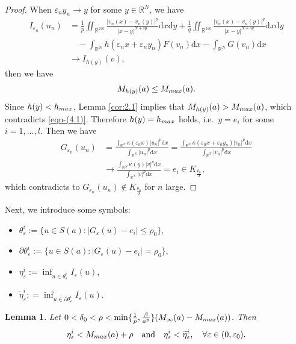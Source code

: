 \documentclass[10pt,a4paper]{amsart}
\numberwithin{equation}{section}
\newtheorem{lemma}[theorem]{Lemma}
\begin{document}
\begin{proof}
When $\varepsilon_n y_n\to y$ for some $y\in\mathbb{R}^N$, we have
\begin{align*}
I_{\varepsilon_n}(u_n)
&= \frac{1}{p}\iint_{\mathbb{R}^{2N}}\frac{|v_n(x)-v_n(y)|^{p}}{|x-y|^{N+sp}}
 \mathrm{d}x\mathrm{d}y+\frac{1}{q}\iint_{\mathbb{R}^{2N}}
 \frac{|v_n(x)-v_n(y)|^{q}}{|x-y|^{N+sq}}\mathrm{d}x\mathrm{d}y\\
&\quad -\int_{\mathbb{R}^N}h(\varepsilon_n x+\varepsilon_n y_n)F(v_n)\mathrm{d}x
 -\int_{\mathbb{R}^N}G(v_n)\mathrm{d}x\\
&\to I_{h(y)}(v),
\end{align*}
then we have
\begin{equation}\label{eqn-(4.1)}
M_{h(y)}(a)\le M_{\rm max}(a).
\end{equation}
Since $h(y) < h_{\rm max}$, Lemma \ref{cor:2.1} implies that $M_{h(y)}
(a) > M_{\rm max}(a)$,
 which contradicts \eqref{eqn-(4.1)}.
Therefore $h(y) = h_{\rm max}$ holds, i.e.\ $y = e_i$
for some $i = 1,\dots,l$. Then we have
\begin{align*}
G_{\varepsilon_n}(u_n)
&=\frac{\int_{\mathbb{R}^N}\kappa(\varepsilon_n x)|u_n|^{p}\mathrm{d}x}
 {\int_{\mathbb{R}^N}|u_n|^{p}\mathrm{d}x}
 =\frac{\int_{\mathbb{R}^N}\kappa(\varepsilon_n x+\varepsilon_n y_n)|v_n|^{p}
 \mathrm{d}x}{\int_{\mathbb{R}^N}|v_n|^{p}\mathrm{d}x}\\
&\to\frac{\int_{\mathbb{R}^N}\kappa(y)|v|^{p}\mathrm{d}x}
{\int_{\mathbb{R}^N}|v|^{p}\mathrm{d}x}=e_i\in K_{\frac{\rho_0}{2}},
\end{align*}
which contradicts to $G_{\varepsilon_n}(u_n)\not\in K_{\frac{\rho_0}{2}}$ for $n$ 
large.
\end{proof}

Next, we introduce some symbols:
\begin{itemize}
\item $\theta_\varepsilon^{i}:=\{u\in S(a):|G_{\varepsilon}(u)-e_i|\le\rho_0\}$,
\item $\partial\theta_\varepsilon^{i}:=\{u\in S(a):|G_{\varepsilon}(u)-e_i|=\rho_0\}$,
\item $\eta_\varepsilon^{i}:=\inf_{u\in\theta_\varepsilon^{i}}  I_\varepsilon(u)$,
\item $\widetilde\eta_\varepsilon^{i}:
=\inf_{u\in\partial\theta_\varepsilon^{i}}  I_\varepsilon(u)$.
\end{itemize}

\begin{lemma}\label{lem:4.2}
Let $0<\delta_0<\rho<\min\{{\frac{1}{p},\frac{\beta}{a^{p}}}\}
(M_\infty(a)-M_{\rm max}(a))$.
Then
$$
\eta_\varepsilon^{i}<M_{\rm max}(a)+\rho\quad \text{and} \quad 
\eta_\varepsilon^{i}<\widetilde\eta_\varepsilon^{i},\quad 
\forall\varepsilon\in(0,\varepsilon_0).
$$
\end{lemma}
\end{document}
